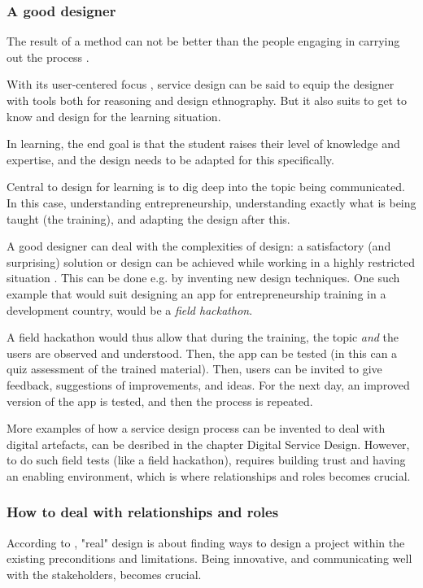 \subsubsection{A good designer}

The result of a method can not be better than the people engaging in carrying out the process \citep{lowgren}.

With its user-centered focus \citep{stickdorn}, service design can be said to equip the designer with tools both for reasoning and design ethnography. But it also suits to get to know and design for the learning situation.

In learning, the end goal is that the student raises their level of knowledge and expertise, and the design needs to be adapted for this specifically.

Central to design for learning is to dig deep into the topic being communicated. In this case, understanding entrepreneurship, understanding exactly what is being taught (the training), and adapting the design after this.

A good designer can deal with the complexities of design: a satisfactory (and surprising) solution or design can be achieved while working in a highly restricted situation \citep{lowgren}. This can be done e.g. by inventing new design techniques. One such example that would suit designing an app for entrepreneurship training in a development country, would be a \textit{field hackathon}.

A field hackathon would thus allow that during the training, the topic \textit{and} the users are observed and understood. Then, the app can be tested (in this can a quiz assessment of the trained material). Then, users can be invited to give feedback, suggestions of improvements, and  ideas. For the next day, an improved version of the app is tested, and then the process is repeated.

More examples of how a service design process can be invented to deal with digital artefacts, can be desribed in the chapter Digital Service Design. However, to do such field tests (like a field hackathon), requires building trust and having an enabling environment, which is where relationships and roles becomes crucial.

\subsubsection{How to deal with relationships and roles}
According to \cite{lowgren}, "real" design is about finding ways to design a project within the existing preconditions and limitations. Being innovative, and communicating well with the stakeholders, becomes crucial.

